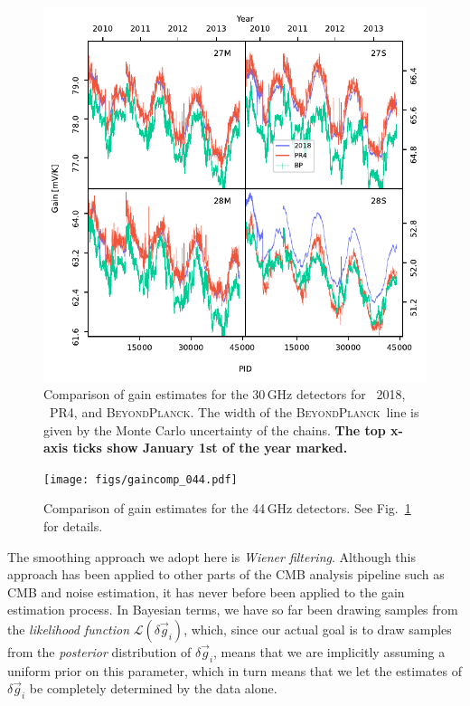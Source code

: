\documentclass[twocolumn]{aa}
\newcommand{\g}[0]{\vec{g}}
\newcommand{\BP}{\textsc{BeyondPlanck}}
\begin{document}
\begin{figure}[t]
  \center
  \includegraphics[width=\linewidth]{figs/gaincomp_030.pdf}
    \caption{Comparison of gain estimates for the 30\,GHz detectors for \Planck\ 2018, \Planck\ PR4, and \BP. 
    The width of the \BP\ line is given by the Monte Carlo uncertainty of the chains. \textbf{The top x-axis ticks show January 1st of the year marked.}}
  \label{fig:gaincomp_030}
\end{figure}

\begin{figure}[t]
  \center
  \texttt{[image: figs/gaincomp\_044.pdf]}
    \caption{Comparison of gain estimates for the 44\,GHz detectors. 
    See Fig.~\ref{fig:gaincomp_030} for details.}
  \label{fig:gaincomp_044}
\end{figure}

The smoothing approach we adopt here is \emph{Wiener filtering}. Although this approach has been applied to other parts of the CMB analysis pipeline such as CMB and noise estimation, it has never before been applied to the gain estimation process. In Bayesian terms, we have so far been drawing samples from the \emph{likelihood function} $\mathcal{L}(\delta \g_i)$, which, since our actual goal is to draw samples from the \emph{posterior} distribution of $\delta \g_i$, means that we are implicitly assuming a uniform prior on this parameter, which in turn means that we let the estimates of $\delta \g_i$ be completely determined by the data alone. 
\end{document}
